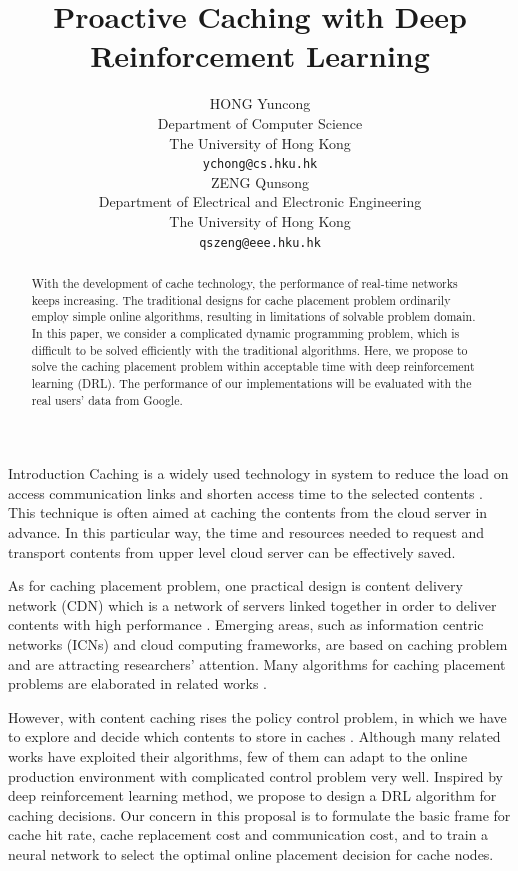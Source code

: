 \documentclass{article}
\title{Proactive Caching with Deep Reinforcement Learning}
\author{
  HONG Yuncong \\
  Department of Computer Science \\
  The University of Hong Kong \\
  \texttt{ychong@cs.hku.hk} \\
  \And %
  ZENG Qunsong \\
  Department of Electrical and Electronic Engineering \\
  The University of Hong Kong \\
  \texttt{qszeng@eee.hku.hk} \\
}
\begin{document}
\maketitle

\begin{abstract}
  With the development of cache technology, the performance of real-time networks keeps increasing. The traditional designs for cache placement problem ordinarily employ simple online algorithms, resulting in limitations of solvable problem domain. In this paper, we consider a complicated dynamic programming problem, which is difficult to be solved efficiently with the traditional algorithms. Here, we propose to solve the caching placement problem within acceptable time with deep reinforcement learning (DRL). The performance of our implementations will be evaluated with the real users' data from Google.
\end{abstract}

\begin{section}{Introduction}
    \label{intro}
    Caching is a widely used technology in system to reduce the load on access communication links and shorten access time to the selected contents \cite{general-cache}. This technique is often aimed at caching the contents from the cloud server in advance. In this particular way, the time and resources needed to request and transport contents from upper level cloud server can be effectively saved.
    
    As for caching placement problem, one practical design is content delivery network (CDN) which is a network of servers linked together in order to deliver contents with high performance \cite{cloudflare}. Emerging areas, such as information centric networks (ICNs) and cloud computing frameworks, \cite{ref1,ref2,ref3,ref4} are based on caching problem and are attracting researchers' attention. Many algorithms for caching placement problems are elaborated in related works \cite{dl-mec,dl-icn,expert-cdn}.
    
    However, with content caching rises the policy control problem, in which we have to explore and decide which contents to store in caches \cite{DBLP:journals/corr/abs-1712-08132}. Although many related works have exploited their algorithms, few of them can adapt to the online production environment with complicated control problem very well. Inspired by deep reinforcement learning method, we propose to design a DRL algorithm for caching decisions. Our concern in this proposal is to formulate the basic frame for cache hit rate, cache replacement cost and communication cost, and to train a neural network to select the optimal online placement decision for cache nodes.
\end{section}
\end{document}
